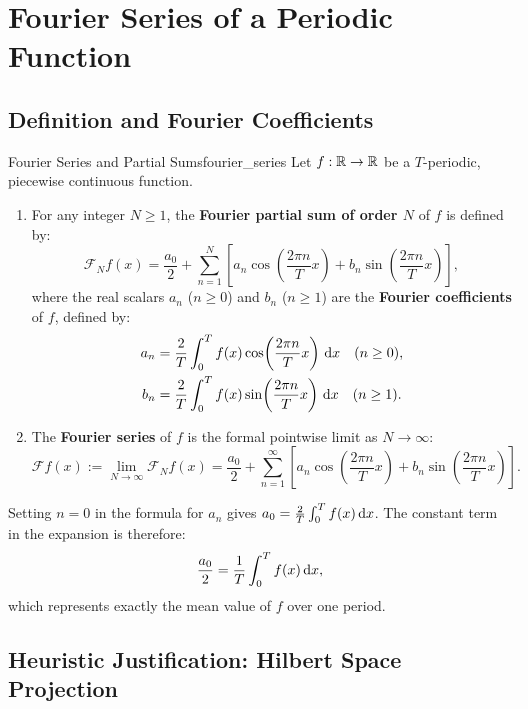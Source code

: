 \section{Fourier Series of a Periodic Function}

\subsection{Definition and Fourier Coefficients}

\begin{definition}{Fourier Series and Partial Sums}{fourier_series}
Let $f: \mathbb{R} \to \mathbb{R}$ be a $T$-periodic, piecewise continuous function.
\begin{enumerate}
    \item For any integer $N \ge 1$, the \textbf{Fourier partial sum of order $N$} of $f$ is defined by:
    \[
    \mathcal{F}_N f(x) = \frac{a_0}{2} + \sum_{n=1}^N \left[ a_n \cos\!\left(\frac{2\pi n}{T} x\right) + b_n \sin\!\left(\frac{2\pi n}{T} x\right) \right],
    \]
    where the real scalars $a_n$ ($n \ge 0$) and $b_n$ ($n \ge 1$) are the \textbf{Fourier coefficients} of $f$, defined by:
    \begin{align*}
    a_n &= \frac{2}{T} \int_0^T f(x) \cos\!\left(\frac{2\pi n}{T} x\right) \,\mathrm{d}x \quad (n \ge 0), \\
    b_n &= \frac{2}{T} \int_0^T f(x) \sin\!\left(\frac{2\pi n}{T} x\right) \,\mathrm{d}x \quad (n \ge 1).
    \end{align*}
    \item The \textbf{Fourier series} of $f$ is the formal pointwise limit as $N \to \infty$:
    \[
    \mathcal{F}f(x) := \lim_{N \to \infty} \mathcal{F}_N f(x) = \frac{a_0}{2} + \sum_{n=1}^\infty \left[ a_n \cos\!\left(\frac{2\pi n}{T} x\right) + b_n \sin\!\left(\frac{2\pi n}{T} x\right) \right].
    \]
\end{enumerate}
\end{definition}

\begin{remarque}
Setting $n = 0$ in the formula for $a_n$ gives $a_0 = \frac{2}{T} \int_0^T f(x) \,\mathrm{d}x$. The constant term in the expansion is therefore:
\[
\frac{a_0}{2} = \frac{1}{T} \int_0^T f(x) \,\mathrm{d}x,
\]
which represents exactly the mean value of $f$ over one period.
\end{remarque}

\subsection{Heuristic Justification: Hilbert Space Projection}

